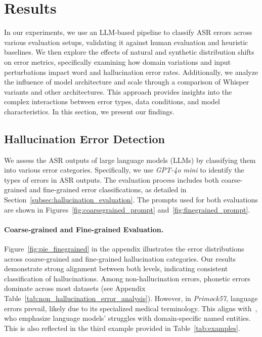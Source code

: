 \section{Results}\label{sec:results}
In our experiments, we use an LLM-based pipeline to classify ASR errors across various evaluation setups, validating it against human evaluation and heuristic baselines. We then explore the effects of natural and synthetic distribution shifts on error metrics, specifically examining how domain variations and input perturbations impact word and hallucination error rates. Additionally, we analyze the influence of model architecture and scale through a comparison of Whisper variants and other architectures. This approach provides insights into the complex interactions between error types, data conditions, and model characteristics. In this section, we present our findings. 




\subsection{Hallucination Error Detection}

We assess the ASR outputs of large language models (LLMs) by classifying them into various error categories. Specifically, we use \emph{GPT-4o mini} to identify the types of errors in ASR outputs. The evaluation process includes both coarse-grained and fine-grained error classifications, as detailed in Section~\ref{subsec:hallucination_evaluation}. The prompts used for both evaluations are shown in Figures~\ref{fig:coarsegrained_prompt} and~\ref{fig:finegrained_prompt}.


\paragraph{Coarse-grained and Fine-grained Evaluation.} Figure~\ref{fig:pie_finegrained} in the appendix illustrates the error distributions across coarse-grained and fine-grained hallucination categories. Our results demonstrate strong alignment between both levels, indicating consistent classification of hallucinations. Among non-hallucination errors, phonetic errors dominate across most datasets (see Appendix Table~\ref{tab:non_hallucination_error_analysis}). However, in \emph{Primock57}, language errors prevail, likely due to its specialized medical terminology. This aligns with~\cite{ferrando2024know}, who emphasize language models' struggles with domain-specific named entities. This is also reflected in the third example provided in Table~\ref{tab:examples}.



